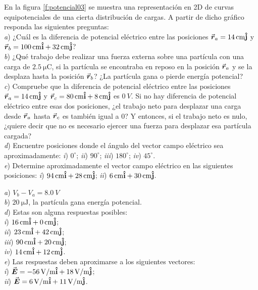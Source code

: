 %
\begin{Exercise}\label{p:potencial03}
  En la figura \ref{f:potencial03} se muestra una representación en 2D de curvas equipotenciales de una cierta distribución de cargas. A partir de dicho gráfico responda las siguientes preguntas:\\
  \textit{a}) ¿Cuál es la diferencia de potencial eléctrico entre las posiciones $\va*{r}_a = \SI{14}{cm}\vu{j}$ y $\va*{r}_b = \SI{100}{cm}\vu{i} + \SI{32}{cm}\vu{j}$?\\
  \textit{b}) ¿Qué trabajo debe realizar una fuerza externa sobre una partícula con una carga de $\SI{2.5}{\micro\coulomb}$, si la partícula se encontraba en reposo en la posición $\va*{r}_a$ y se la desplaza hasta la posición $\va*{r}_b$? ¿La partícula gana o pierde energía potencial?\\
  \textit{c}) Compruebe que la diferencia de potencial eléctrico entre las posiciones $\va*{r}_a = \SI{14}{cm}\vu{j}$ y $\va*{r}_c = \SI{80}{cm}\vu{i} + \SI{8}{cm}\vu{j}$ es $\SI{0}{V}$. Si no hay diferencia de potencial eléctrico entre esas dos posiciones, ¿el trabajo neto para desplazar una carga desde $\va*{r}_a$ hasta $\va*{r}_c$ es también igual a $0$? Y entonces, si el trabajo neto es nulo, ¿quiere decir que no es necesario ejercer una fuerza para desplazar esa partícula cargada?\\
  \textit{d}) Encuentre posiciones donde el ángulo del vector campo eléctrico sea aproximadamente: \textit{i}) $0^\circ$; \textit{ii}) $90^\circ$; \textit{iii}) $180^\circ$; \textit{iv}) $45^\circ$.\\
  \textit{e}) Determine aproximadamente el vector campo eléctrico en las siguientes posiciones: \textit{i}) $\SI{94}{cm}\vu{i} + \SI{28}{cm}\vu{j}$; \textit{ii}) $\SI{6}{cm}\vu{i} + \SI{30}{cm}\vu{j}$.
\end{Exercise}
\begin{Answer}
	\begin{minipage}[t]{.4\textwidth}
    \textit{a}) $V_b-V_a = \SI{8.0}{V}$\\
    \textit{b}) $\SI{20}{\micro\joule}$, la partícula gana energía potencial.\\
    \textit{d}) Estas son alguna respuestas posibles:\\
    \textit{i}) $\SI{16}{cm}\vu{i} + \SI{0}{cm}\vu{j}$;\\
    \textit{ii}) $\SI{23}{cm}\vu{i} + \SI{42}{cm}\vu{j}$;\\
    \textit{iii}) $\SI{90}{cm}\vu{i} + \SI{20}{cm}\vu{j}$;\\
    \textit{iv}) $\SI{14}{cm}\vu{i} + \SI{12}{cm}\vu{j}$.\\
    \textit{e}) Las respuestas deben aproximarse a los siguientes vectores:\\
    \textit{i}) $\va*{E} = \SI{-56}{V/m}\vu{i} +\SI{18}{V/m}\vu{j}$;\\
    \textit{ii}) $\va*{E} = \SI{6}{V/m}\vu{i} +\SI{11}{V/m}\vu{j}$.
  \end{minipage}
\end{Answer}
